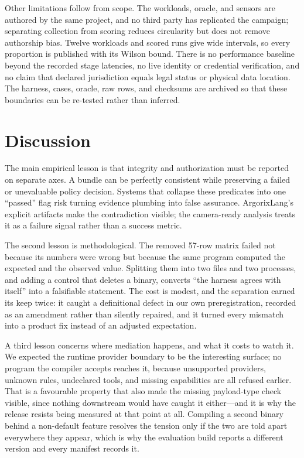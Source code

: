 \documentclass[conference]{IEEEtran}
\begin{document}
Other limitations follow from scope.  The workloads, oracle, and sensors are
authored by the same project, and no third party has replicated the campaign;
separating collection from scoring reduces circularity but does not remove
authorship bias.  Twelve workloads and \campaignScoredRows{} scored runs give
wide intervals, so every proportion is published with its Wilson bound.  There is no
performance baseline beyond the recorded stage latencies, no live identity or
credential verification, and no claim that declared jurisdiction equals legal
status or physical data location.  The harness, cases, oracle, raw rows, and
checksums are archived so that these boundaries can be re-tested rather than
inferred.

\section{Discussion}

The main empirical lesson is that integrity and authorization must be reported
on separate axes.  A bundle can be perfectly consistent while preserving a
failed or unevaluable policy decision.  Systems that collapse these predicates
into one ``passed'' flag risk turning evidence plumbing into false assurance.
ArgorixLang's explicit artifacts make the contradiction visible; the
camera-ready analysis treats it as a failure signal rather than a success
metric.

The second lesson is methodological.  The removed 57-row matrix failed not
because its numbers were wrong but because the same program computed the
expected and the observed value.  Splitting them into two files and two
processes, and adding a control that deletes a binary, converts ``the harness
agrees with itself'' into a falsifiable statement.  The cost is modest, and the
separation earned its keep twice: it caught a definitional defect in our own
preregistration, recorded as an amendment rather than silently repaired, and it
turned every mismatch into a product fix instead of an adjusted expectation.

A third lesson concerns where mediation happens, and what it costs to watch it.
We expected the runtime provider boundary to be the interesting surface; no
program the compiler accepts reaches it, because unsupported providers, unknown
rules, undeclared tools, and missing capabilities are all refused earlier.  That
is a favourable property that also made the missing payload-type check visible,
since nothing downstream would have caught it either---and it is why the release
resists being measured at that point at all.  Compiling a second binary behind a
non-default feature resolves the tension only if the two are told apart
everywhere they appear, which is why the evaluation build reports a different
version and every manifest records it.
\end{document}
